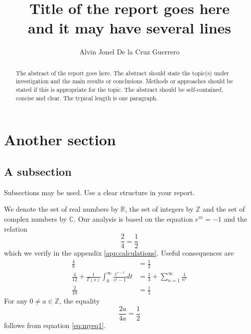 \documentclass{uonmathreport}
\title{Title of the report goes here\\ and it may have several lines}
\author{Alvin Jonel De la Cruz Guerrero}
\newcommand{\ZZ}{\mathbb{Z}}
\begin{document}
\maketitle

\begin{abstract}
The abstract of the report goes here. The abstract should state the
topic(s) under investigation and the main results or
conclusions. Methods or approaches should be stated if this is
appropriate for the topic. The abstract should be self-contained,
concise and clear. The typical length is one paragraph.
\end{abstract}

\setcounter{tocdepth}{3}  %
\tableofcontents 
\newpage









\section{Another section} \label{sec:my1}

\subsection{A subsection} \label{subsec:theory}

Subsections may be used. Use a clear structure in your report.

We denote the set of real numbers by
$\mathbb{R}$, the set of integers by $\ZZ$ and the set of complex
numbers by $\mathbb{C}$. Our analysis is based on the equation
$e^{\pi i} = -1$ and the relation
\begin{equation}
  \frac{2}{4} = \frac{1}{2}   \label{eq:myeq1}
\end{equation} %
which we verify in the appendix \ref{app:calculations}.
Useful consequences are
\begin{align}
  \frac{4}{8} &= \frac{1}{2} \\
  \frac{4}{12} + \frac{1}{\Gamma(s)}\int_0^{\infty} \frac{t^{s-1}}{e^t-1} dt
     &= \frac{1}{3} +\sum_{n=1}^{\infty} \frac{1}{n^s}\\
  \frac{2}{10} &= \frac{1}{5} 
\end{align}
For any $0\neq a\in \ZZ$, the equality
\begin{equation*} %
 \frac{2 a}{4 a} = \frac{1}{2}
\end{equation*}
follows from equation \eqref{eq:myeq1}.
\end{document}
